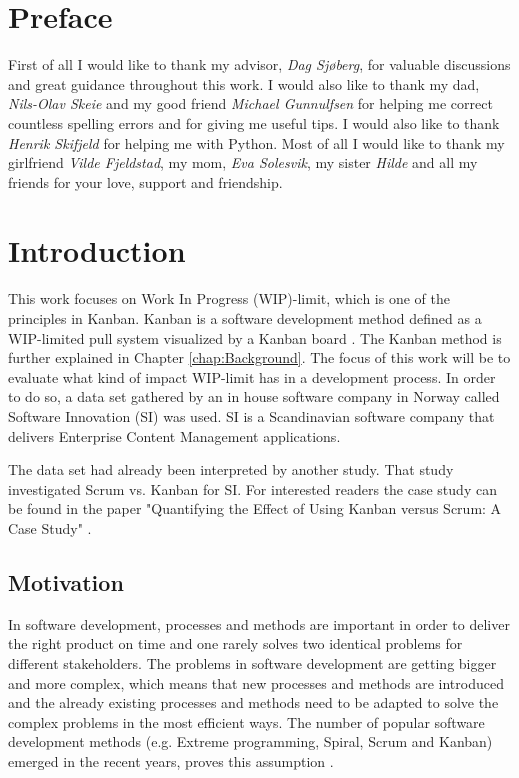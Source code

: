 \documentclass[UKenglish]{ifimaster}  %
\begin{document}
\chapter*{Preface}                    %
First of all I would like to thank my advisor, \textit{Dag Sj\o berg}, for valuable discussions and great guidance throughout this work. I would also like to thank my dad, \textit{Nils-Olav Skeie} and my good friend \textit{Michael Gunnulfsen} for helping me correct countless spelling errors and for giving me useful tips. I would also like to thank \textit{Henrik Skifjeld} for helping me with Python. Most of all I would like to thank my girlfriend \textit{Vilde Fjeldstad}, my mom, \textit{Eva Solesvik}, my sister \textit{Hilde} and all my friends for your love, support and friendship.   
\mainmatter{}
\chapter{Introduction}
\label{chap:intro}
This work focuses on Work In Progress (WIP)-limit, which is one of the principles in Kanban. Kanban is a software development method defined as a WIP-limited pull system visualized by a Kanban board \parencite{DavidAnderson}. The Kanban method is further explained in Chapter \ref{chap:Background}. The focus of this work will be to evaluate what kind of impact WIP-limit has in a development process. In order to do so, a data set gathered by an in house software company in Norway called Software Innovation (SI) was used. SI is a Scandinavian software company that delivers Enterprise Content Management applications.

The data set had already been interpreted by another study. That study investigated Scrum vs. Kanban for SI. For interested readers the case study can be found in the paper "Quantifying the Effect of Using Kanban versus Scrum: A Case Study" \parencite{Dag}. 

\section{Motivation}
In software development, processes and methods are important in order to deliver the right product on time and one rarely solves two identical problems for different stakeholders. The problems in software development are getting bigger and more complex, which means that new processes and methods are introduced and the already existing processes and methods need to be adapted to solve the complex problems in the most efficient ways.  The number of popular software development methods  (e.g. Extreme programming, Spiral, Scrum and Kanban) emerged in the recent years, proves this assumption \parencite{gandomani2013important} \parencite{ikonen2010exploring}.
\end{document}
